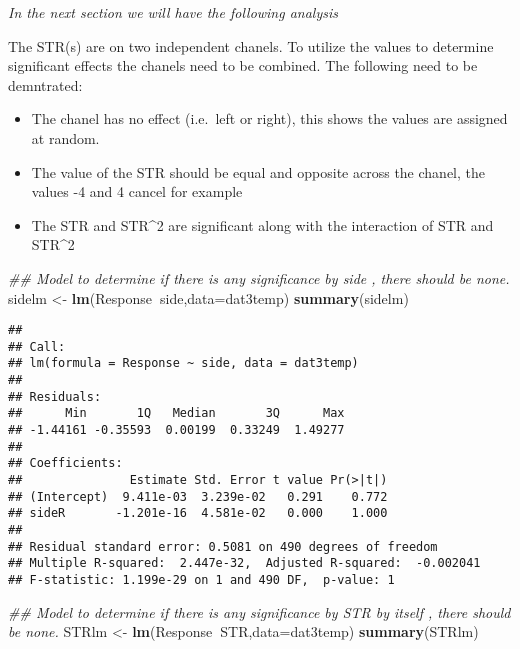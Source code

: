 \documentclass[
]{article}
\newenvironment{Shaded}{\begin{snugshade}}{\end{snugshade}}
\newcommand{\CommentTok}[1]{\textcolor[rgb]{0.56,0.35,0.01}{\textit{#1}}}
\newcommand{\DataTypeTok}[1]{\textcolor[rgb]{0.13,0.29,0.53}{#1}}
\newcommand{\KeywordTok}[1]{\textcolor[rgb]{0.13,0.29,0.53}{\textbf{#1}}}
\newcommand{\NormalTok}[1]{#1}
\newcommand{\OperatorTok}[1]{\textcolor[rgb]{0.81,0.36,0.00}{\textbf{#1}}}
\newcommand{\StringTok}[1]{\textcolor[rgb]{0.31,0.60,0.02}{#1}}
\providecommand{\tightlist}{%
  \setlength{\itemsep}{0pt}\setlength{\parskip}{0pt}}
\begin{document}
\emph{In the next section we will have the following analysis}

The STR(s) are on two independent chanels. To utilize the values to
determine significant effects the chanels need to be combined. The
following need to be demntrated:

\begin{itemize}
\tightlist
\item
  The chanel has no effect (i.e.~left or right), this shows the values
  are assigned at random.
\item
  The value of the STR should be equal and opposite across the chanel,
  the values -4 and 4 cancel for example
\item
  The STR and STR\^{}2 are significant along with the interaction of STR
  and STR\^{}2
\end{itemize}

\begin{Shaded}
\begin{Highlighting}[]
\CommentTok{## Model to determine if there is any significance by side , there should be none.}
\NormalTok{sidelm <-}\StringTok{ }\KeywordTok{lm}\NormalTok{(Response}\OperatorTok{~}\NormalTok{side,}\DataTypeTok{data=}\NormalTok{dat3temp)}
\KeywordTok{summary}\NormalTok{(sidelm)}
\end{Highlighting}
\end{Shaded}

\begin{verbatim}
## 
## Call:
## lm(formula = Response ~ side, data = dat3temp)
## 
## Residuals:
##      Min       1Q   Median       3Q      Max 
## -1.44161 -0.35593  0.00199  0.33249  1.49277 
## 
## Coefficients:
##               Estimate Std. Error t value Pr(>|t|)
## (Intercept)  9.411e-03  3.239e-02   0.291    0.772
## sideR       -1.201e-16  4.581e-02   0.000    1.000
## 
## Residual standard error: 0.5081 on 490 degrees of freedom
## Multiple R-squared:  2.447e-32,  Adjusted R-squared:  -0.002041 
## F-statistic: 1.199e-29 on 1 and 490 DF,  p-value: 1
\end{verbatim}

\begin{Shaded}
\begin{Highlighting}[]
\CommentTok{## Model to determine if there is any significance by STR by itself , there should be none.}
\NormalTok{STRlm <-}\StringTok{ }\KeywordTok{lm}\NormalTok{(Response}\OperatorTok{~}\NormalTok{STR,}\DataTypeTok{data=}\NormalTok{dat3temp)}
\KeywordTok{summary}\NormalTok{(STRlm)}
\end{Highlighting}
\end{Shaded}
\end{document}

